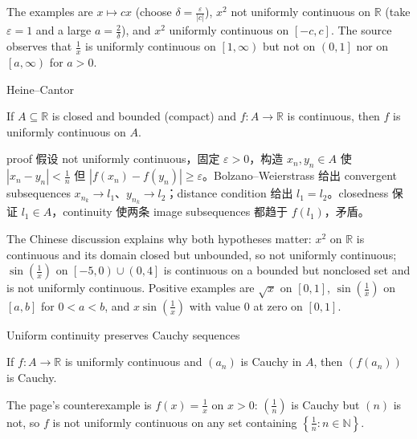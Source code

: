 The examples are \(x\mapsto cx\) (choose \(\delta = \frac{\varepsilon}{|c|}\)), \(x^{2}\) not uniformly continuous on \(\mathbb{R}\) (take \(\varepsilon = 1\) and a large \(a = \frac{2}{\delta}\)), and \(x^{2}\) uniformly continuous on \(\left\lbrack {- c,c} \right\rbrack\). The source observes that \(\frac{1}{x}\) is uniformly continuous on \(\left\lbrack {1,\infty} \right)\) but not on \(\left( {0,1} \right\rbrack\) nor on \(\left\lbrack {a,\infty} \right)\) for \(a > 0\).

\begin{theorem}{Heine--Cantor}

If \(A \subseteq \mathbb{R}\) is closed and bounded (compact) and \(f:A\rightarrow\mathbb{R}\) is continuous, then \(f\) is uniformly continuous on \(A\).

\end{theorem}

proof 假设 not uniformly continuous，固定 \(\varepsilon > 0\)，构造 \(x_{n},y_{n} \in A\) 使 \(\left| {x_{n} - y_{n}} \right| < \frac{1}{n}\) 但 \(\left| {f\left( x_{n} \right) - f\left( y_{n} \right)} \right| \geq \varepsilon\)。Bolzano--Weierstrass 给出 convergent subsequences \(x_{n_{k}}\rightarrow l_{1}\)、\(y_{n_{k}}\rightarrow l_{2}\)；distance condition 给出 \(l_{1} = l_{2}\)。closedness 保证 \(l_{1} \in A\)，continuity 使两条 image subsequences 都趋于 \(f\left( l_{1} \right)\)，矛盾。

The Chinese discussion explains why both hypotheses matter: \(x^{2}\) on \(\mathbb{R}\) is continuous and its domain closed but unbounded, so not uniformly continuous; \(\sin\left( \frac{1}{x} \right)\) on \(\left\lbrack {- 5,0} \right) \cup \left( {0,4} \right\rbrack\) is continuous on a bounded but nonclosed set and is not uniformly continuous. Positive examples are \(\sqrt{x}\) on \(\left\lbrack {0,1} \right\rbrack\), \(\sin\left( \frac{1}{x} \right)\) on \(\left\lbrack {a,b} \right\rbrack\) for \(0 < a < b\), and \(x\sin\left( \frac{1}{x} \right)\) with value \(0\) at zero on \(\left\lbrack {0,1} \right\rbrack\).

\begin{theorem}{Uniform continuity preserves Cauchy sequences}

If \(f:A\rightarrow\mathbb{R}\) is uniformly continuous and \(\left( a_{n} \right)\) is Cauchy in \(A\), then \(\left( {f\left( a_{n} \right)} \right)\) is Cauchy.

\end{theorem}

The page's counterexample is \(f(x) = \frac{1}{x}\) on \(x > 0\): \(\left( \frac{1}{n} \right)\) is Cauchy but \((n)\) is not, so \(f\) is not uniformly continuous on any set containing \(\left\{ {\frac{1}{n}:n \in \mathbb{N}} \right\}\).

